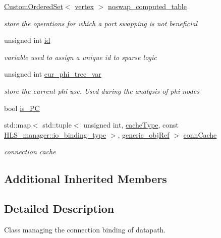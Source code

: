 \begin{DoxyCompactItemize}
\hyperlink{classCustomOrderedSet}{Custom\+Ordered\+Set}$<$ \hyperlink{graph_8hpp_abefdcf0544e601805af44eca032cca14}{vertex} $>$ \hyperlink{classmux__connection__binding_a8605219f931f5173519515526515b3bd}{noswap\+\_\+computed\+\_\+table}
\begin{DoxyCompactList}\small\item\em store the operations for which a port swapping is not beneficial \end{DoxyCompactList}\item 
unsigned int \hyperlink{classmux__connection__binding_a29d2b0e043edf53408192cdb8f770b19}{id}
\begin{DoxyCompactList}\small\item\em variable used to assign a unique id to sparse logic \end{DoxyCompactList}\item 
unsigned int \hyperlink{classmux__connection__binding_a7ba6eaf97161963dc246e6db966e6386}{cur\+\_\+phi\+\_\+tree\+\_\+var}
\begin{DoxyCompactList}\small\item\em store the current phi use. Used during the analysis of phi nodes \end{DoxyCompactList}\item 
bool \hyperlink{classmux__connection__binding_a1e2a12ebf8b4526a747c73d91d97adc9}{is\+\_\+\+PC}
\item 
std\+::map$<$ std\+::tuple$<$ unsigned int, \hyperlink{classmux__connection__binding_aaf8d69f505f7832b20e1b0c50c3b6efe}{cache\+Type}, const \hyperlink{classHLS__manager_a972627cc658afa992590b9d2bf1a1e87}{H\+L\+S\+\_\+manager\+::io\+\_\+binding\+\_\+type} $>$, \hyperlink{generic__obj_8hpp_acb533b2ef8e0fe72e09a04d20904ca81}{generic\+\_\+obj\+Ref} $>$ \hyperlink{classmux__connection__binding_a2d3ec6f686648da3f5f4d02ff4f7a2f9}{conn\+Cache}
\begin{DoxyCompactList}\small\item\em connection cache \end{DoxyCompactList}\end{DoxyCompactItemize}
\subsection*{Additional Inherited Members}


\subsection{Detailed Description}
Class managing the connection binding of datapath. 

